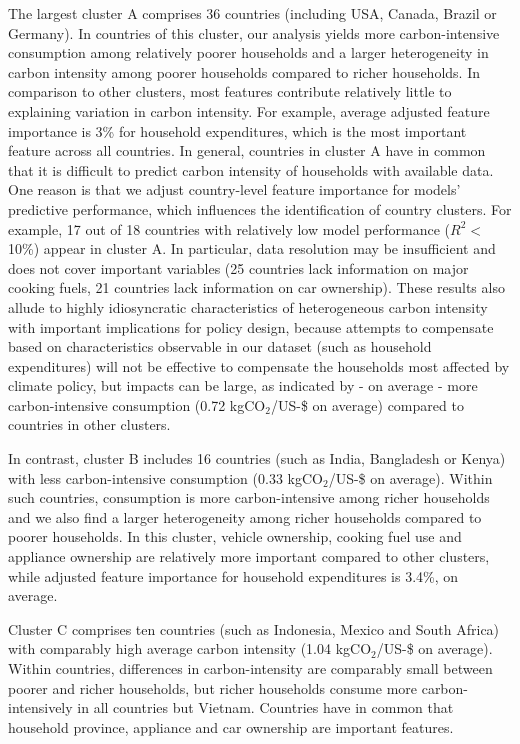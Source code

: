 \documentclass[12pt, a4paper]{article}
\begin{document}
The largest cluster A comprises 36 countries (including USA, Canada, Brazil or Germany). In countries of this cluster, our analysis yields more carbon-intensive consumption among relatively poorer households and a larger heterogeneity in carbon intensity among poorer households compared to richer households. In comparison to other clusters, most features contribute relatively little to explaining variation in carbon intensity. For example, average adjusted feature importance is 3\% for household expenditures, which is the most important feature across all countries. In general, countries in cluster A have in common that it is difficult to predict carbon intensity of households with available data. One reason is that we adjust country-level feature importance for models' predictive performance, which influences the identification of country clusters. For example, 17 out of 18 countries with relatively low model performance ($R^{2}<$10\%) appear in cluster A. In particular, data resolution may be insufficient and does not cover important variables (25 countries lack information on major cooking fuels, 21 countries lack information on car ownership). These results also allude to highly idiosyncratic characteristics of heterogeneous carbon intensity with important implications for policy design, because attempts to compensate based on characteristics observable in our dataset (such as household expenditures) will not be effective to compensate the households most affected by climate policy, but impacts can be large, as indicated by - on average - more carbon-intensive consumption (0.72 kgCO$_{2}$/US-\$ on average) compared to countries in other clusters. 

In contrast, cluster B includes 16 countries (such as India, Bangladesh or Kenya) with less carbon-intensive consumption (0.33 kgCO$_{2}$/US-\$ on average). Within such countries, consumption is more carbon-intensive among richer households and we also find a larger heterogeneity among richer households compared to poorer households. In this cluster, vehicle ownership, cooking fuel use and appliance ownership are relatively more important compared to other clusters, while adjusted feature importance for household expenditures is 3.4\%, on average.

Cluster C comprises ten countries (such as Indonesia, Mexico and South Africa) with comparably high average carbon intensity (1.04 kgCO$_{2}$/US-\$ on average). Within countries, differences in carbon-intensity are comparably small between poorer and richer households, but richer households consume more carbon-intensively in all countries but Vietnam. Countries have in common that household province, appliance and car ownership are important features.
\end{document}
